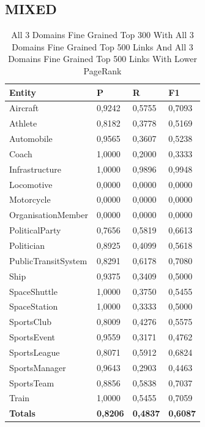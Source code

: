 \documentclass[thesis=M,english]{FITthesis}[2018/05/30]
\begin{document}
\subsection{MIXED}
\begin{table}[H]\centering
		\label{}
		\begin{tabular}{|l|l|l|l|}
			\hline {\textbf{Entity}} & {\textbf{P}} & {\textbf{R}} & {\textbf{F1}}\\\hline
				Aircraft & 0,9242 & 0,5755 & 0,7093\\
				Athlete & 0,8182 & 0,3778 & 0,5169\\
				Automobile & 0,9565 & 0,3607 & 0,5238\\ 
				Coach & 1,0000 & 0,2000 & 0,3333\\
				Infrastructure & 1,0000 & 0,9896 & 0,9948\\
				Locomotive & 0,0000 & 0,0000 & 0,0000\\
				Motorcycle & 0,0000 & 0,0000 & 0,0000\\
				OrganisationMember & 0,0000 & 0,0000 & 0,0000\\				
				PoliticalParty & 0,7656 & 0,5819 & 0,6613\\
				Politician & 0,8925 & 0,4099 & 0,5618\\
				PublicTransitSystem & 0,8291 & 0,6178 & 0,7080\\
				Ship & 0,9375 & 0,3409 & 0,5000\\
				SpaceShuttle & 1,0000 & 0,3750 & 0,5455\\
				SpaceStation & 1,0000 & 0,3333 & 0,5000\\ 
				SportsClub & 0,8009 & 0,4276 & 0,5575\\
				SportsEvent & 0,9559 & 0,3171 & 0,4762\\
				SportsLeague & 0,8071 & 0,5912 & 0,6824\\
				SportsManager & 0,9643 & 0,2903 & 0,4463\\
				SportsTeam & 0,8856 & 0,5838 & 0,7037\\
				Train & 1,0000 & 0,5455 & 0,7059\\\hline
				\textbf{Totals} & \textbf{0,8206} & \textbf{0,4837} & \textbf{0,6087}\\\hline
		\end{tabular}
		\caption{All 3 Domains Fine Grained Top 300 With All 3 Domains Fine Grained Top 500 Links And All 3 Domains Fine Grained Top 500 Links With Lower PageRank}
	\end{table}
\end{document}
